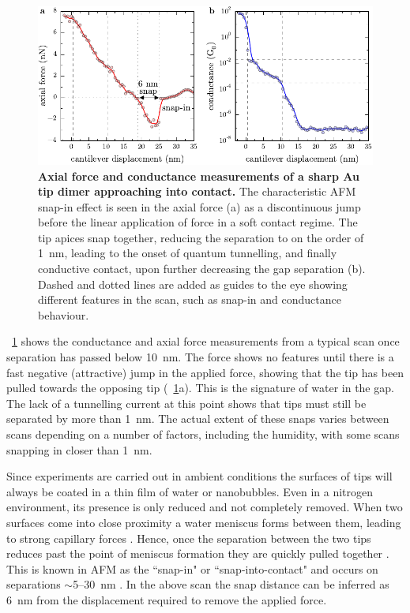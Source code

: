 \documentclass[a4paper]{article}
\begin{document}
\begin{figure}[bt]
\centering
\includegraphics{figures/tip_scanning_properties}
\caption[Axial force and conductance measurements of a sharp Au tip dimer approaching into contact]{\textbf{Axial force and conductance measurements of a sharp Au tip dimer approaching into contact.} The characteristic AFM snap-in effect is seen in the axial force (a) as a discontinuous jump before the linear application of force in a soft contact regime. The tip apices snap together, reducing the separation to on the order of \SI{1}{nm}, leading to the onset of quantum tunnelling, and finally conductive contact, upon further decreasing the gap separation (b). Dashed and dotted lines are added as guides to the eye showing different features in the scan, such as snap-in and conductance behaviour.}
\label{fig:tip_scan_props}
\end{figure}

\figurename~\ref{fig:tip_scan_props} shows the conductance and axial force measurements from a typical scan once separation has passed below \SI{10}{nm}. The force shows no features until there is a fast negative (attractive) jump in the applied force, showing that the tip has been pulled towards the opposing tip (\figurename~\ref{fig:tip_scan_props}a). This is the signature of water in the gap. The lack of a tunnelling current at this point shows that tips must still be separated by more than \SI{1}{nm}. The actual extent of these snaps varies between scans depending on a number of factors, including the humidity, with some scans snapping in closer than \SI{1}{nm}.

Since experiments are carried out in ambient conditions the surfaces of tips will always be coated in a thin film of water or nanobubbles. Even in a nitrogen environment, its presence is only reduced and not completely removed. When two surfaces come into close proximity a water meniscus forms between them, leading to strong capillary forces \cite{gan2009atomic}. Hence, once the separation between the two tips reduces past the point of meniscus formation they are quickly pulled together \cite{holmberg2003}. This is known in AFM as the ``snap-in" or ``snap-into-contact" and occurs on separations $\sim$5--\SI{30}{nm} \cite{holmberg2003, song2014}. In the above scan the snap distance can be inferred as \SI{6}{nm} from the displacement required to remove the applied force.
\end{document}
